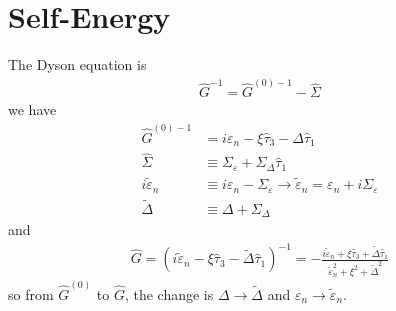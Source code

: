 \documentclass[]{article}
\begin{document}
\section{Self-Energy}

The Dyson equation is
\begin{align}
    \widehat{G}^{-1} = \widehat{G}^{(0)-1} - \widehat{\Sigma}
\end{align}
we have
\begin{align}
    \widehat{G}^{(0)-1}    & = i\varepsilon_n - \xi\widehat{\tau}_3 - \Delta\widehat{\tau}_1 \\
    \widehat{\Sigma}       & \equiv \Sigma_\varepsilon + \Sigma_\Delta \widehat{\tau}_1      \\
    i\tilde{\varepsilon}_n & \equiv i\varepsilon_n - \Sigma_\varepsilon
    \rightarrow \tilde{\varepsilon}_n = \varepsilon_n + i\Sigma_\varepsilon                  \\
    \tilde{\Delta}         & \equiv \Delta + \Sigma_\Delta
\end{align}
and
\begin{align}
    \widehat{G} = (i\tilde{\varepsilon}_n - \xi\widehat{\tau}_3 - \tilde{\Delta}\widehat{\tau}_1)^{-1}
    = - \frac{i\tilde{\varepsilon}_n + \xi\widehat{\tau}_3 + \tilde{\Delta}\widehat{\tau}_1}
    {\tilde{\varepsilon}_n^2 + \xi^2 + \tilde{\Delta}^2}
\end{align}
so from $\widehat{G}^{(0)}$ to $\widehat{G}$, the change is $\Delta \rightarrow \tilde{\Delta}$
and $\varepsilon_n \rightarrow \tilde{\varepsilon}_n$.
\end{document}
